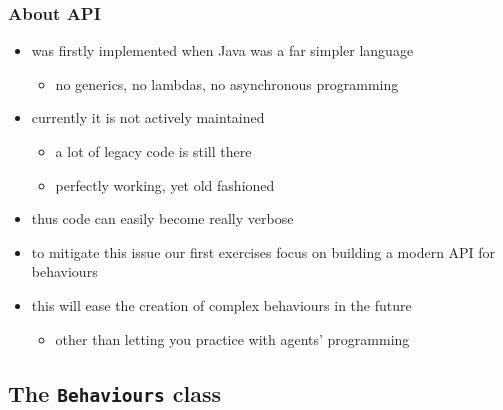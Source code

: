 \documentclass{beamer}\mode<presentation>{\usetheme{AMSCesenaPurpleAndGold}}
\begin{document}
\begin{frame}\frametitle{About \jade{} API}
    \begin{itemize}
        \item \jade{} was firstly implemented when Java was a far simpler language
        \begin{itemize}
            \item no generics, no lambdas, no asynchronous programming
        \end{itemize}

        \vfill

        \item currently it is not actively maintained
        \begin{itemize}
            \item a lot of legacy code is still there
            \item perfectly working, yet old fashioned
        \end{itemize}

        \vfill

        \item thus \jade{} code can easily become really verbose

        \vfill

        \item to mitigate this issue our first exercises focus on building a modern API for behaviours

        \vfill

        \item this will ease the creation of complex behaviours in the future
        \begin{itemize}
            \item other than letting you practice with \jade{} agents' programming
        \end{itemize}
    \end{itemize}
\end{frame}

\subsection{The \texttt{Behaviours} class}
\end{document}
